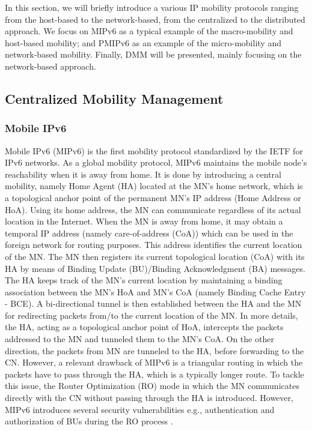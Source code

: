 In this section, we will briefly introduce a various IP mobility protocols ranging from the host-based to the network-based, from the centralized to  the distributed approach. We focus on MIPv6 as a typical example of the macro-mobility and host-based mobility; and PMIPv6 as an example of the micro-mobility and network-based mobility. Finally, DMM will be presented, mainly focusing on the network-based approach. 
 
 \subsection{Centralized Mobility Management}
\subsubsection{Mobile IPv6}
Mobile IPv6 (MIPv6) \cite{MIPv6} is the first mobility protocol standardized by the IETF for IPv6 networks. As a global mobility protocol, MIPv6 maintains the mobile node's reachability when it is away from home. It is done by introducing a central mobility, namely Home Agent (HA) located at the MN's home network, which is a topological anchor point of the permanent MN's IP address (Home Address or HoA). Using its home address, the MN can communicate regardless of its actual location in the Internet. When the MN is away from home, it may obtain a temporal IP address (namely care-of-address (CoA)) which can be used in the foreign network for routing purposes. This address identifies the current location of the MN. The MN then registers its current topological location (CoA) with its HA by means of Binding Update (BU)/Binding Acknowledgment (BA) messages. The HA keeps track of the MN's current location by maintaining a binding association between the MN's HoA and MN's CoA (namely Binding Cache Entry - BCE). A bi-directional tunnel is then established between the HA and the MN for redirecting packets from/to the current location of the MN. In more details, the HA, acting as a topological anchor point of HoA, intercepts the packets addressed to the MN and tunneled them to the MN's CoA. On the other direction, the packets from MN are tunneled to the HA, before forwarding to the CN. However, a relevant drawback of MIPv6 is a triangular routing in which the packets have to pass through the HA, which is a typically longer route. To tackle this issue, the Router Optimization (RO) mode in which the MN communicates directly with the CN without passing through the HA is introduced. However, MIPv6 introduces several security vulnerabilities e.g., authentication and authorization of BUs during the RO process \cite{MIP_RO}. 

